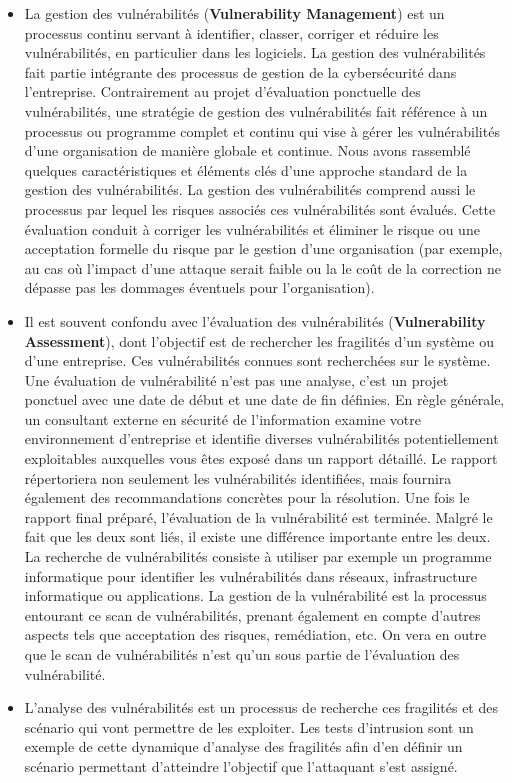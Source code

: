 \begin{itemize}
\item La gestion des vulnérabilités (\textbf{Vulnerability Management}) est un processus continu servant à identifier, classer, corriger et réduire les vulnérabilités, en particulier dans les logiciels. La gestion des vulnérabilités fait partie intégrante des processus de gestion de la cybersécurité dans l’entreprise. Contrairement au projet d’évaluation ponctuelle des vulnérabilités, une stratégie de gestion des vulnérabilités fait référence à un processus ou programme complet et continu qui vise à gérer les vulnérabilités d’une organisation de manière globale et continue. Nous avons rassemblé quelques caractéristiques et éléments clés d’une approche standard de la gestion des vulnérabilités.
La gestion des vulnérabilités comprend aussi le processus par lequel  les risques associés ces vulnérabilités sont évalués. Cette évaluation conduit à corriger les vulnérabilités et éliminer le risque ou une acceptation formelle du risque par le gestion d’une organisation (par exemple, au cas où l’impact d’une attaque serait faible ou la le coût de la correction ne dépasse pas les dommages éventuels pour l’organisation).
\item Il est souvent confondu avec l’évaluation des vulnérabilités (\textbf{Vulnerability Assessment}), dont l’objectif est de rechercher les fragilités d’un système ou d’une entreprise. Ces vulnérabilités connues sont recherchées sur le système. Une évaluation de vulnérabilité n'est pas une analyse, c'est un projet ponctuel avec une date de début et une date de fin définies. En règle générale, un consultant externe en sécurité de l'information examine votre environnement d'entreprise et identifie diverses vulnérabilités potentiellement exploitables auxquelles vous êtes exposé dans un rapport détaillé. Le rapport répertoriera non seulement les vulnérabilités identifiées, mais fournira également des recommandations concrètes pour la résolution. Une fois le rapport final préparé, l'évaluation de la vulnérabilité est terminée.
Malgré le fait que les deux sont liés, il existe une différence importante entre les deux. La recherche de vulnérabilités consiste à utiliser par exemple un programme informatique pour identifier les vulnérabilités dans réseaux, infrastructure informatique ou applications. La gestion de la vulnérabilité est la processus entourant ce scan de vulnérabilités, prenant également en compte d’autres aspects tels que acceptation des risques, remédiation, etc. On vera en outre que le scan de vulnérabilités n’est qu’un sous partie de l’évaluation des vulnérabilité.
\item L’analyse des vulnérabilités est un processus de recherche ces fragilités et des scénario qui vont permettre de les exploiter. Les tests d’intrusion sont un exemple de cette dynamique d’analyse des fragilités afin d’en définir un scénario permettant d’atteindre l’objectif que l’attaquant s’est assigné.
\end{itemize}


